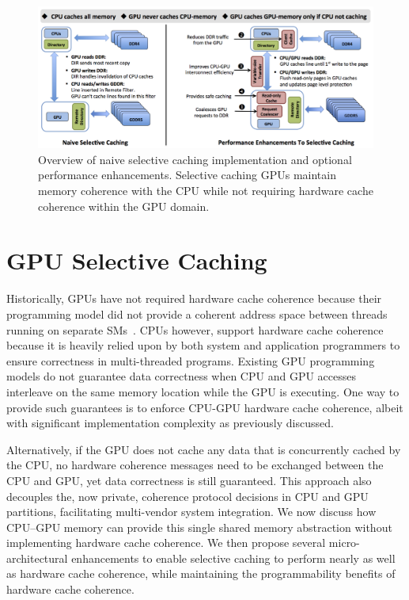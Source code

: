 \begin{figure}[tp]
\centering
\includegraphics[width=1.0\textwidth]{hpca2016/figures/coherence_overview.png}
\caption{Overview of naive selective caching implementation and optional performance enhancements.
Selective caching GPUs maintain memory coherence with the CPU while not
requiring hardware cache coherence within the GPU domain.}
\label{fig:coherence_overview}
\vspace{.05in}
\end{figure}

\section{GPU Selective Caching}
\label{proposal}

Historically, GPUs have not required hardware cache coherence because their
programming model did not provide a coherent address space between threads running on separate
SMs~\cite{CUDA7}.  CPUs however, support hardware cache coherence 
because it is heavily relied upon by both system and application
programmers to ensure correctness in multi-threaded programs. 
Existing GPU programming models do not guarantee data correctness when CPU and GPU accesses
interleave on the same memory location while the GPU is executing. One way to
provide such guarantees is to enforce CPU-GPU hardware cache coherence, albeit with significant implementation 
complexity as previously discussed.

Alternatively, if the GPU does not cache any data that is concurrently cached by the CPU,
no hardware coherence messages need to be exchanged between the CPU and GPU, yet data correctness is still guaranteed. 
This approach also decouples
the, now private, coherence protocol decisions in CPU and GPU partitions, facilitating multi-vendor 
system integration.  We now discuss how CPU--GPU
memory can provide this single shared memory abstraction without implementing 
hardware cache coherence. We then propose several micro-architectural enhancements to enable selective caching
to perform nearly as well as hardware cache coherence, while maintaining the programmability benefits of hardware cache coherence.

